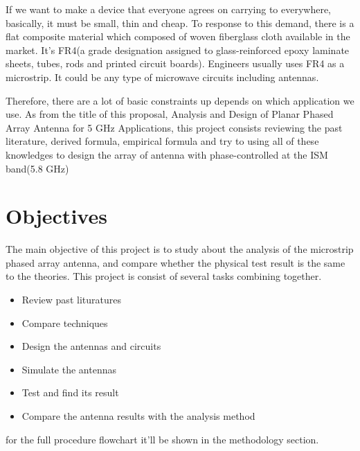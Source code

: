 \documentclass[11pt,a4paper,hidelinks]{article}
\begin{document}
    \indent If we want to make a device that everyone agrees on carrying to everywhere, basically, it must be small, thin and cheap.
            To response to this demand, there is a flat composite material which composed of woven fiberglass cloth available in the market.
            It's FR4(a grade designation assigned to glass-reinforced epoxy laminate sheets, tubes, rods and printed circuit boards).
            Engineers usually uses FR4 as a microstrip. It could be any type of microwave circuits including antennas.
    
    \indent Therefore, there are a lot of basic constraints up depends on which application we use. As from the title of this proposal,
            Analysis and Design of Planar Phased Array Antenna for 5 GHz Applications, this project consists reviewing the
            past literature, derived formula, empirical formula and try to using all of these knowledges to design the array of antenna with
            phase-controlled at the ISM band(5.8 GHz)
  
  \newpage

  \section{Objectives}
    \indent The main objective of this project is to study about the analysis of the microstrip phased array antenna, and compare whether the 
            physical test result is the same to the theories. This project is consist of several tasks combining together.
            
    \begin{itemize}
      \item Review past lituratures
      \item Compare techniques
      \item Design the antennas and circuits
      \item Simulate the antennas
      \item Test and find its result
      \item Compare the antenna results with the analysis method
    \end{itemize}
    \indent for the full procedure flowchart it'll be shown in the methodology section.
   
  \newpage
  
\end{document}
